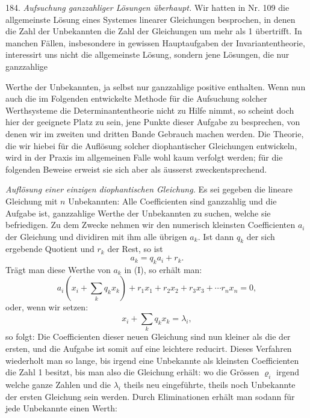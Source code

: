 184. \textit{Aufsuchung ganzzahliger Lösungen überhaupt.} Wir hatten in Nr. 109 die allgemeinste Lösung eines Systemes linearer Gleichungen besprochen, in denen die Zahl der Unbekannten die Zahl der Gleichungen um mehr als 1 übertrifft. In manchen Fällen, insbesondere in gewissen Hauptaufgaben der Invariantentheorie, interessirt uns nicht die allgemeinste Lösung, sondern jene Lösungen, die nur ganzzahlige


Werthe der Unbekannten, ja selbst nur ganzzahlige positive enthalten. Wenn nun auch die im Folgenden entwickelte Methode für die Aufsuchung solcher Werthsysteme die Determinantentheorie nicht zu Hilfe nimmt, so scheint doch hier der geeignete Platz zu sein, jene Punkte dieser Aufgabe zu besprechen, von denen wir im zweiten und dritten Bande Gebrauch machen werden. Die Theorie, die wir hiebei für die Auflösung solcher diophantischer Gleichungen entwickeln, wird in der Praxis im allgemeinen Falle wohl kaum verfolgt werden; für die folgenden Beweise erweist sie sich aber als äusserst zweckentsprechend.

\textit{Auflösung einer einzigen diophantischen Gleichung.} Es sei gegeben die lineare Gleichung mit $n$ Unbekannten:
Alle Coefficienten sind ganzzahlig und die Aufgabe ist, ganzzahlige Werthe der Unbekannten zu suchen, welche sie befriedigen. Zu dem Zwecke nehmen wir den numerisch kleinsten Coefficienten $a_i$ der Gleichung und dividiren mit ihm alle übrigen $a_k$. Ist dann $q_k$ der sich ergebende Quotient und $r_k$ der Rest, so ist
\[
a_k = q_ka_i + r_k.
\]
Trägt man diese Werthe von $a_k$ in (I), so erhält man:
\[
a_i\left(x_i + \sum_k q_kx_k\right) + r_1x_1 + r_2x_2 + r_3x_3 + \cdots r_nx_n = 0,
\]
oder, wenn wir setzen:
\[
x_i + \sum_k q_kx_k = \lambda_i,
\]
so folgt:
Die Coefficienten dieser neuen Gleichung sind nun kleiner als die der ersten, und die Aufgabe ist somit auf eine leichtere reducirt. Dieses Verfahren wiederholt man so lange, bis irgend eine Unbekannte als kleinsten Coefficienten die Zahl 1 besitzt, bis man also die Gleichung erhält:
wo die Grössen $\varrho_i$ irgend welche ganze Zahlen und die $\lambda_i$ theils neu eingeführte, theils noch Unbekannte der ersten Gleichung sein werden. Durch Eliminationen erhält man sodann für jede Unbekannte einen Werth:


